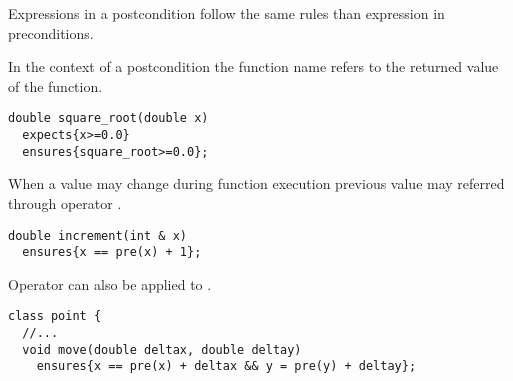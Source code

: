 Expressions in a postcondition follow the same rules than expression in preconditions.

In the context of a postcondition the function name refers to the returned
value of the function.

\begin{lstlisting}
double square_root(double x)
  expects{x>=0.0}
  ensures{square_root>=0.0};
\end{lstlisting}

When a value may change during function execution previous value may referred
through operator .

\begin{lstlisting}
double increment(int & x)
  ensures{x == pre(x) + 1};
\end{lstlisting}

Operator  can also be applied to .

\begin{lstlisting}
class point {
  //...
  void move(double deltax, double deltay)
    ensures{x == pre(x) + deltax && y = pre(y) + deltay};
\end{lstlisting}

